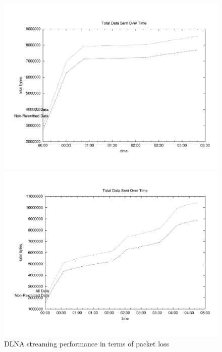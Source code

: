 \begin{figure}[H]
\begin{minipage}[b]{0.45\linewidth}
\includegraphics[width=\textwidth]{charts/dlna_traffic_10loss_data}
\end{minipage}
\begin{minipage}[b]{0.45\linewidth}
\centering
\includegraphics[width=\textwidth]{charts/dlna_traffic_15loss_data}
\end{minipage}
\caption{DLNA streaming performance in terms of packet loss}\label{multiavp}
\end{figure}

